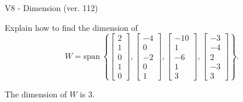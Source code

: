 \begin{exercise}
  \begin{exerciseTitle}V8 - Dimension (ver. 112)\end{exerciseTitle}
  \begin{exerciseStatement}
    Explain how to find the dimension of 
\[W=\mathrm{span}\ \left\{\left[\begin{array}{r}
2 \\
1 \\
0 \\
1 \\
0
\end{array}\right] , \left[\begin{array}{r}
-4 \\
0 \\
-2 \\
0 \\
1
\end{array}\right] , \left[\begin{array}{r}
-10 \\
1 \\
-6 \\
1 \\
3
\end{array}\right] , \left[\begin{array}{r}
-3 \\
-4 \\
2 \\
-3 \\
3
\end{array}\right]\right\}.\]



  \end{exerciseStatement}
  \begin{exerciseAnswer}
   The dimension of \(W\) is  \(3\).
  


  \end{exerciseAnswer}
\end{exercise}